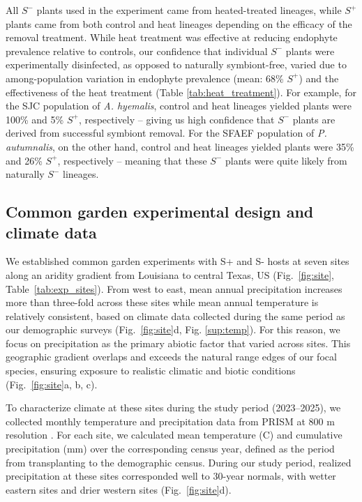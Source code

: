 \documentclass[12pt]{article}\usepackage[]{graphicx}\usepackage[dvipsnames]{xcolor}
\begin{document}
All $S^-$ plants used in the experiment came from heated-treated lineages, while $S^+$ plants came from both control and heat lineages depending on the efficacy of the removal treatment. 
While heat treatment was effective at reducing endophyte prevalence relative to controls, our confidence that individual $S^-$ plants were experimentally disinfected, as opposed to naturally symbiont-free, varied due to among-population variation in endophyte prevalence (mean: 68\% $S^+$) and the effectiveness of the heat treatment (Table \ref{tab:heat_treatment}). 
For example, for the SJC population of \emph{A. hyemalis}, control and heat lineages yielded plants were 100\% and 5\% $S^+$, respectively -- giving us high confidence that $S^-$ plants are derived from successful symbiont removal. 
For the SFAEF population of \emph{P. autumnalis}, on the other hand, control and heat lineages yielded plants were 35\% and 26\% $S^+$, respectively -- meaning that these $S^-$ plants were quite likely from naturally $S^-$ lineages.

\subsection*{Common garden experimental design and climate data}
We established common garden experiments with S+ and S- hosts at seven sites along an aridity gradient from Louisiana to central Texas, US (Fig.~\ref{fig:site}, Table~\ref{tab:exp_sites}).
From west to east, mean annual precipitation increases more than three-fold across these sites while mean annual temperature is relatively consistent, based on climate data collected during the same period as our demographic surveys (Fig.~\ref{fig:site}d, Fig. \ref{sup:temp}).
For this reason, we focus on precipitation as the primary abiotic factor that varied across sites.  
This geographic gradient overlaps and exceeds the natural range edges of our focal species, ensuring exposure to realistic climatic and biotic conditions (Fig.~\ref{fig:site}a, b, c). 

To characterize climate at these sites during the study period (2023–2025), we collected monthly temperature and precipitation data from PRISM at 800 m resolution \citep{PRISM2024}. 
For each site, we calculated mean temperature (\textdegree C) and cumulative precipitation (mm) over the corresponding census year, defined as the period from transplanting to the demographic census.
During our study period, realized precipitation at these sites corresponded well to 30-year normals, with wetter eastern sites and drier western sites (Fig.~\ref{fig:site}d).
\end{document}
